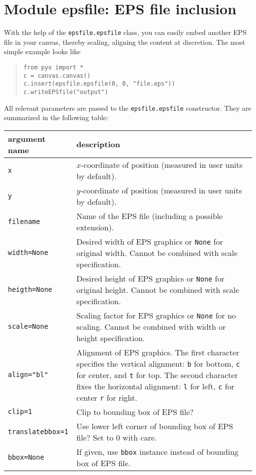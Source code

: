 \chapter{Module epsfile: EPS file inclusion}

With the help of the \verb|epsfile.epsfile| class, you can easily embed
another EPS file in your canvas, thereby scaling, aligning the content
at discretion. The most simple example looks like
\begin{quote}
\begin{verbatim}
from pyx import *
c = canvas.canvas()
c.insert(epsfile.epsfile(0, 0, "file.eps"))
c.writeEPSfile("output")
\end{verbatim}
\end{quote}

All relevant parameters are passed to the \verb|epsfile.epsfile|
constructor. They are summarized in the following table:

\medskip
\begin{tabularx}{\linewidth}{l>{\raggedright\arraybackslash}X}
argument name&description\\
\hline
\texttt{x} & $x$-coordinate of position (measured in user
units by default).\\
\texttt{y} & $y$-coordinate of position (measured in user
units by default).\\
\texttt{filename} & Name of the EPS file (including a possible
extension).\\
\texttt{width=None} & Desired width of EPS graphics or \texttt{None}
for original width. Cannot be combined with scale specification.\\
\texttt{heigth=None} & Desired height of EPS graphics or \texttt{None}
for original height. Cannot be combined with scale specification.\\
\texttt{scale=None} & Scaling factor for EPS graphics or \texttt{None}
for no scaling. Cannot be combined with width or height specification.\\
\texttt{align="bl"} & Alignment of EPS graphics. The first character
specifies the vertical alignment: \texttt{b} for bottom, \texttt{c}
for center, and \texttt{t} for top. The second character fixes the
horizontal alignment: \texttt{l} for left, \texttt{c} for center
\texttt{r} for right.\\
\texttt{clip=1} & Clip to bounding box of EPS file?\\
\texttt{translatebbox=1} & Use lower left corner of bounding box of EPS
file? Set to $0$ with care.\\
\texttt{bbox=None} & If given, use \texttt{bbox} instance instead of
bounding box of EPS file.
\end{tabularx}



\label{epsfile}


